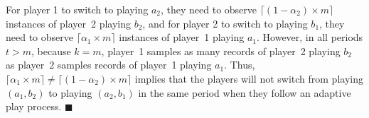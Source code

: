 \documentclass[11.5pt]{article}
\begin{document}

For player 1 to switch to playing $a_2$, they need to observe $\lceil (1-\alpha_2)\times m\rceil$ instances of player~2 playing $b_2$, and for player 2 to switch to playing $b_1$, they need to observe $\lceil \alpha_1\times m\rceil$ instances of player~1 playing $a_1$.
%
However, in all periods $t>m$, because $k=m$, player~1 samples as many records of player~2 playing $b_2$ as player~2 samples records of player~1 playing $a_1$. 
Thus, $\lceil \alpha_1\times m\rceil \neq\lceil (1-\alpha_2)\times m\rceil$ implies that the players will not switch from playing $(a_1,b_2)$ to playing $(a_2,b_1)$ in the same period when they follow an adaptive play process.    
%
$\blacksquare$

\newpage

\end{document}
